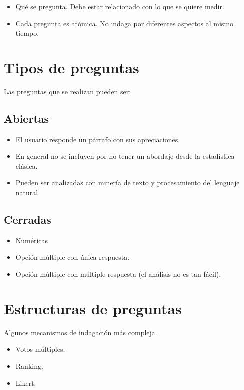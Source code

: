 \documentclass[
  letterpaper,
  DIV=11,
  numbers=noendperiod]{scrreprt}
\providecommand{\tightlist}{%
  \setlength{\itemsep}{0pt}\setlength{\parskip}{0pt}}\usepackage{longtable,booktabs,array}
\begin{document}
\begin{itemize}
\tightlist
\item
  Qué se pregunta. Debe estar relacionado con lo que se quiere medir.
\item
  Cada pregunta es atómica. No indaga por diferentes aspectos al mismo
  tiempo.
\end{itemize}

\section{Tipos de preguntas}\label{tipos-de-preguntas}

Las preguntas que se realizan pueden ser:

\subsection{Abiertas}\label{abiertas}

\begin{itemize}
\tightlist
\item
  El usuario responde un párrafo con sus apreciaciones.
\item
  En general no se incluyen por no tener un abordaje desde la
  estadística clásica.
\item
  Pueden ser analizadas con minería de texto y procesamiento del
  lenguaje natural.
\end{itemize}

\subsection{Cerradas}\label{cerradas}

\begin{itemize}
\tightlist
\item
  Numéricas
\item
  Opción múltiple con única respuesta.
\item
  Opción múltiple con múltiple respuesta (el análisis no es tan fácil).
\end{itemize}

\section{Estructuras de preguntas}\label{estructuras-de-preguntas}

Algunos mecanismos de indagación más compleja.

\begin{itemize}
\tightlist
\item
  Votos múltiples.
\item
  Ranking.
\item
  Likert.
\end{itemize}
\end{document}
